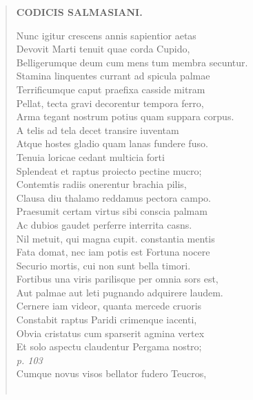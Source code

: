\documentclass[11pt, a4paper]{report}
\begin{document}
\begin{verse}
    \begin{center} \textbf{CODICIS SALMASIANI.} \end{center} \marginpar{[163]} Nunc igitur crescens annis sapientior aetas \\ Devovit Marti tenuit quae corda Cupido, \\ Belligerumque deum cum mens tum membra secuntur. \\ Stamina linquentes currant ad spicula palmae \\ Terrificumque caput praefixa casside mitram \\ Pellat, tecta gravi decorentur tempora ferro, \\ Arma tegant nostrum potius quam suppara corpus. \\ A telis ad tela decet transire iuventam \\ Atque hostes gladio quam lanas fundere fuso. \\ Tenuia loricae cedant multicia forti \\ Splendeat et raptus proiecto pectine mucro; \\ Contemtis radiis onerentur brachia pilis, \\ Clausa diu thalamo reddamus pectora campo. \\ Praesumit certam virtus sibi conscia palmam \\ Ac dubios gaudet perferre interrita casns. \\ Nil metuit, qui magna cupit. constantia mentis \\ Fata domat, nec iam potis est Fortuna nocere \\ Securio mortis, cui non sunt bella timori. \\ Fortibus una viris parilisque per omnia sors est, \\ Aut palmae aut leti pugnando adquirere laudem. \\ Cernere iam videor, quanta mercede cruoris \\ Constabit raptus Paridi crimenque iacenti, \\ Obvia cristatus cum sparserit agmina vertex \\ Et solo aspectu claudentur Pergama nostro; \\ \textit{p. 103} \\ Cumque novus visos bellator fudero Teucros, \\ 
        ﻿\pagebreak 

\end{verse}
\end{document}
